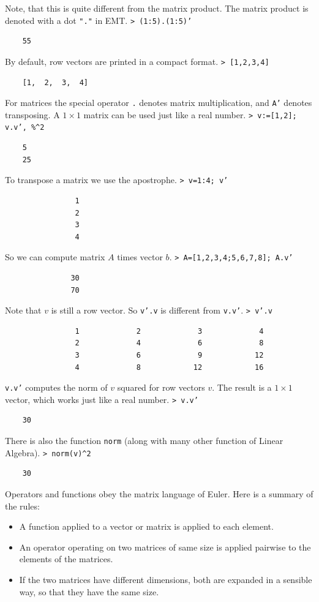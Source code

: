 \documentclass[11pt, a4paper]{article}
\newcommand{\emtcmd}[1]{\noindent\texttt{\textcolor{emtcommand}{>}\ #1}\par\smallskip}
\begin{document}
Note, that this is quite different from the matrix product. The matrix product is denoted with a dot \texttt{"."} in EMT.
\emtcmd{(1:5).(1:5)'}
\begin{verbatim}
    55
\end{verbatim}

By default, row vectors are printed in a compact format.
\emtcmd{[1,2,3,4]}
\begin{verbatim}
    [1,  2,  3,  4]
\end{verbatim}

For matrices the special operator \texttt{.} denotes matrix multiplication, and \texttt{A'} denotes transposing. A $1 \times 1$ matrix can be used just like a real number.
\emtcmd{v:=[1,2]; v.v', \%\^{}2}
\begin{verbatim}
    5
    25
\end{verbatim}

To transpose a matrix we use the apostrophe.
\emtcmd{v=1:4; v'}
\begin{verbatim}
                1
                2
                3
                4
\end{verbatim}

So we can compute matrix $A$ times vector $b$.
\emtcmd{A=[1,2,3,4;5,6,7,8]; A.v'}
\begin{verbatim}
               30
               70
\end{verbatim}

Note that $v$ is still a row vector. So \texttt{v'.v} is different from \texttt{v.v'}.
\emtcmd{v'.v}
\begin{verbatim}
                1             2             3             4
                2             4             6             8
                3             6             9            12
                4             8            12            16
\end{verbatim}

\texttt{v.v'} computes the norm of $v$ squared for row vectors $v$. The result is a $1 \times 1$ vector, which works just like a real number.
\emtcmd{v.v'}
\begin{verbatim}
    30
\end{verbatim}

There is also the function \texttt{norm} (along with many other function of Linear Algebra).
\emtcmd{norm(v)\^{}2}
\begin{verbatim}
    30
\end{verbatim}

Operators and functions obey the matrix language of Euler. Here is a summary of the rules:
\begin{itemize}
    \item A function applied to a vector or matrix is applied to each element.
    \item An operator operating on two matrices of same size is applied pairwise to the elements of the matrices.
    \item If the two matrices have different dimensions, both are expanded in a sensible way, so that they have the same size.
\end{itemize}
\end{document}
